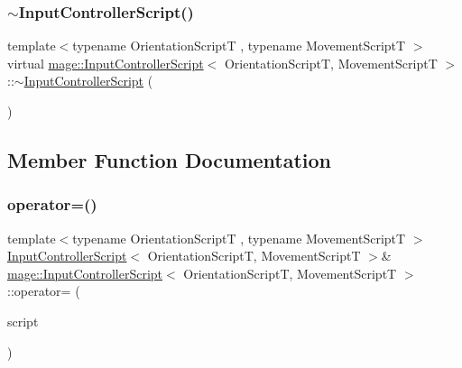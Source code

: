 \hypertarget{classmage_1_1_input_controller_script_ac5699d9a4d9a3f9c456885a92dede979}{}\label{classmage_1_1_input_controller_script_ac5699d9a4d9a3f9c456885a92dede979} 
\subsubsection{\texorpdfstring{$\sim$\+Input\+Controller\+Script()}{~InputControllerScript()}}
{\footnotesize\ttfamily template$<$typename Orientation\+ScriptT , typename Movement\+ScriptT $>$ \\
virtual \hyperlink{classmage_1_1_input_controller_script}{mage\+::\+Input\+Controller\+Script}$<$ Orientation\+ScriptT, Movement\+ScriptT $>$\+::$\sim$\hyperlink{classmage_1_1_input_controller_script}{Input\+Controller\+Script} (\begin{DoxyParamCaption}{ }\end{DoxyParamCaption})\hspace{0.3cm}{\ttfamily [virtual]}}



\subsection{Member Function Documentation}
\hypertarget{classmage_1_1_input_controller_script_a747a0a1cb4064a5b8580195c0a53b887}{}\label{classmage_1_1_input_controller_script_a747a0a1cb4064a5b8580195c0a53b887} 
\subsubsection{\texorpdfstring{operator=()}{operator=()}\hspace{0.1cm}{\footnotesize\ttfamily [1/2]}}
{\footnotesize\ttfamily template$<$typename Orientation\+ScriptT , typename Movement\+ScriptT $>$ \\
\hyperlink{classmage_1_1_input_controller_script}{Input\+Controller\+Script}$<$ Orientation\+ScriptT, Movement\+ScriptT $>$\& \hyperlink{classmage_1_1_input_controller_script}{mage\+::\+Input\+Controller\+Script}$<$ Orientation\+ScriptT, Movement\+ScriptT $>$\+::operator= (\begin{DoxyParamCaption}\item[{const \hyperlink{classmage_1_1_input_controller_script}{Input\+Controller\+Script}$<$ Orientation\+ScriptT, Movement\+ScriptT $>$ \&}]{script }\end{DoxyParamCaption})\hspace{0.3cm}{\ttfamily [delete]}}

